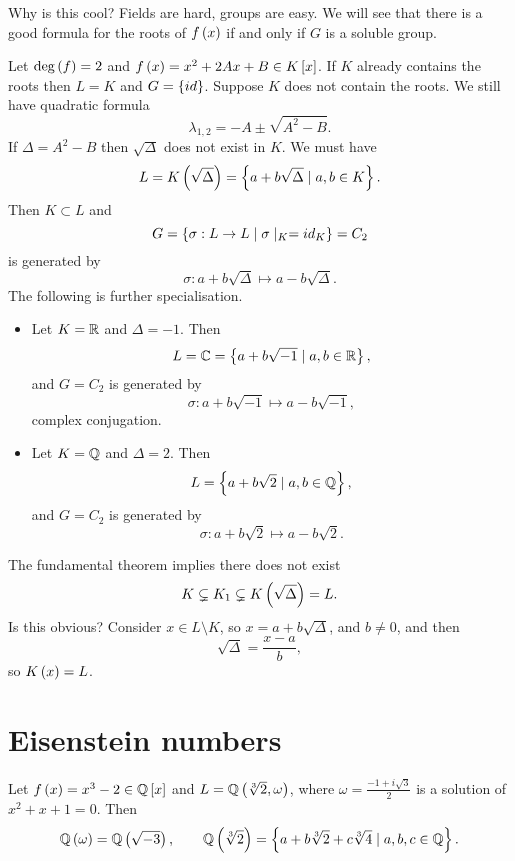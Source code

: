 Why is this cool? Fields are hard, groups are easy. We will see that there is a good formula for the roots of $ f\left( x \right) $ if and only if $ G $ is a soluble group.


\begin{example*}
Let $ \deg\left( f \right) = 2 $ and $ f\left( x \right) = x^2 + 2Ax + B \in K\left[ x \right] $. If $ K $ already contains the roots then $ L = K $ and $ G = \left\{ id \right\} $. Suppose $ K $ does not contain the roots. We still have quadratic formula
$$ \lambda_{1, 2} = -A \pm \sqrt{A^2 - B}. $$
If $ \Delta = A^2 - B $ then $ \sqrt{\Delta} $ does not exist in $ K $. We must have
$$ L = K\left( \sqrt{\Delta} \right) = \left\{ a + b\sqrt{\Delta} \mid a, b \in K \right\}. $$
Then $ K \subset L $ and
$$ G = \left\{ \sigma : L \to L \mid \sigma \mid_K = id_K \right\} = C_2 $$
is generated by
$$ \sigma : a + b\sqrt{\Delta} \mapsto a - b\sqrt{\Delta}. $$
The following is further specialisation.
\begin{itemize}
\item Let $ K = \mathbb{R} $ and $ \Delta = -1 $. Then
$$ L = \mathbb{C} = \left\{ a + b\sqrt{-1} \mid a, b \in \mathbb{R} \right\}, $$
and $ G = C_2 $ is generated by
$$ \sigma : a + b\sqrt{-1} \mapsto a - b\sqrt{-1}, $$
complex conjugation.
\item Let $ K = \mathbb{Q} $ and $ \Delta = 2 $. Then
$$ L = \left\{ a + b\sqrt{2} \mid a, b \in \mathbb{Q} \right\}, $$
and $ G = C_2 $ is generated by
$$ \sigma : a + b\sqrt{2} \mapsto a - b\sqrt{2}. $$
\end{itemize}
The fundamental theorem implies there does not exist
$$ K \subsetneq K_1 \subsetneq K\left( \sqrt{\Delta} \right) = L. $$
Is this obvious? Consider $ x \in L \setminus K $, so $ x = a + b\sqrt{\Delta} $, and $ b \ne 0 $, and then
$$ \sqrt{\Delta} = \dfrac{x - a}{b}, $$
so $ K\left( x \right) = L $.
\end{example*}

\pagebreak

\section{Eisenstein numbers}

Let $ f\left( x \right) = x^3 - 2 \in \mathbb{Q}\left[ x \right] $ and $ L = \mathbb{Q}\left( \sqrt[3]{2}, \omega \right) $, where $ \omega = \tfrac{-1 + i\sqrt{3}}{2} $ is a solution of $ x^2 + x + 1 = 0 $. Then
$$ \mathbb{Q}\left( \omega \right) = \mathbb{Q}\left( \sqrt{-3} \right), \qquad \mathbb{Q}\left( \sqrt[3]{2} \right) = \left\{ a + b\sqrt[3]{2} + c\sqrt[3]{4} \mid a, b, c \in \mathbb{Q} \right\}. $$

